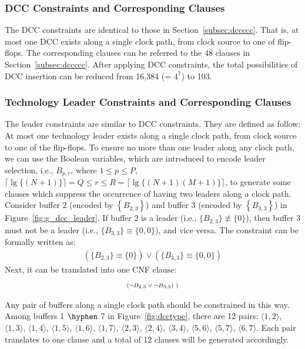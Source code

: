 \subsubsection{DCC Constraints and Corresponding Clauses}
\label{sec:TVA:dcc_c}
The DCC constraints are identical to those in Section~\ref{subsec:dccccc}. That is, at most one DCC exists along a single clock path, from clock source to one of flip-flops. The corresponding clauses can be referred to the 48 clauses in Section~\ref{subsec:dccccc}. After applying DCC constraints, the total possibilities of DCC insertion can be reduced from 16,384 (= $4^7$) to 103. 

\subsubsection{Technology Leader Constraints and Corresponding Clauses}
\label{sec:TVA:dcc_c}
The leader constraints are similar to DCC constraints. They are defined as follow: At most one technology leader exists along a single clock path, from clock source to one of the flip-flops. To ensure no more than one leader along any clock path, we can use the Boolean variables, which are introduced to encode leader selection, i.e., $B_{p,r}$, where $1 \leq p \leq P$, $\lceil \lg \{(N + 1)\} \rceil = Q \leq r \leq R = \lceil \lg \{(N + 1)(M + 1)\} \rceil$, to generate some clauses which suppress the occurrence of having two leaders along a clock path. Consider buffer 2 (encoded by $\left\{B_{2,3}\right\}$) and buffer 3 (encoded by $\left\{B_{3,3}\right\}$) in Figure~\ref{fig:g_dcc_leader}. If buffer 2 is a leader (i.e., $\{B_{2,3}\} \not\equiv \{0\}$), then buffer 3 must not be a leader (i.e., $\{B_{3,3}\} \equiv \{0, 0\}$), and vice versa. The constraint can be formally written as:
\begin{gather*}
\left(\{B_{2,3}\} \equiv \{0\}\right) \lor \left(\{B_{3,3}\} \equiv \{0, 0\}\right)
\end{gather*}
Next, it can be translated into one CNF clause:
\begin{gather*}
\mbox{\fontsize{7}{8.4}\selectfont ($\neg B_{2,3}\lor\neg B_{3,3}$) )} 
\end{gather*}

Any pair of buffers along a single clock path should be constrained in this way. Among buffers 1 $\hyphen$ 7 in Figure~\ref{fig:dcctype}, there are 12 pairs: $\langle1, 2\rangle$, $\langle1, 3\rangle$, $\langle1, 4\rangle$, $\langle1, 5\rangle$, $\langle1, 6\rangle$, $\langle1, 7\rangle$, $\langle2, 3\rangle$, $\langle2, 4\rangle$, $\langle3, 4\rangle$, $\langle5, 6\rangle$, $\langle5, 7\rangle$, $\langle6, 7\rangle$. Each pair translates to one clause and a total of 12 clauses will be generated accordingly.

